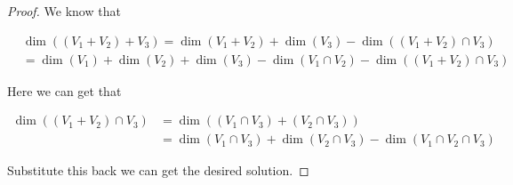 \documentclass{extarticle}
\begin{document}
\begin{proof}
We know that 

\begin{align*}
&\dim ((V_1 + V_2) + V_3) = \dim(V_1 + V_2) + \dim(V_3) - \dim((V_1 + V_2)\cap V_3) \\ 
&= \dim (V_1) + \dim (V_2) + \dim (V_3) - \dim(V_1 \cap V_2) - \dim((V_1 + V_2)\cap V_3)
\end{align*}

Here we can get that 

\begin{align*}
    \dim((V_1 + V_2)\cap V_3) &= \dim((V_1 \cap V_3) + (V_2 \cap V_3)) \\ 
    &= \dim(V_1 \cap V_3) + \dim(V_2 \cap V_3) - \dim(V_1 \cap V_2 \cap V_3)
\end{align*}

Substitute this back we can get the desired solution. 


\end{proof}
\end{document}
